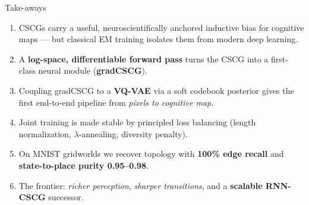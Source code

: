 \documentclass[aspectratio=169,10pt]{beamer}
\begin{document}
\begin{frame}{Take-aways}
  \begin{enumerate}\setlength\itemsep{0.3em}\small
    \item CSCGs carry a useful, neuroscientifically anchored inductive bias for
          cognitive maps --- but classical EM training isolates them from modern
          deep learning.
    \item A \textbf{log-space, differentiable forward pass} turns the CSCG
          into a first-class neural module (\textbf{gradCSCG}).
    \item Coupling gradCSCG to a \textbf{VQ-VAE} via a soft codebook posterior
          gives the first end-to-end pipeline from \emph{pixels to cognitive map}.
    \item Joint training is made stable by principled loss balancing
          (length normalization, $\lambda$-annealing, diversity penalty).
    \item On MNIST gridworlds we recover topology with \textbf{100\%
          edge recall} and \textbf{state-to-place purity 0.95--0.98}.
    \item The frontier: \emph{richer perception}, \emph{sharper transitions},
          and a \textbf{scalable RNN-CSCG} successor.
  \end{enumerate}
\end{frame}

\begin{frame}
\end{frame}
\end{document}
